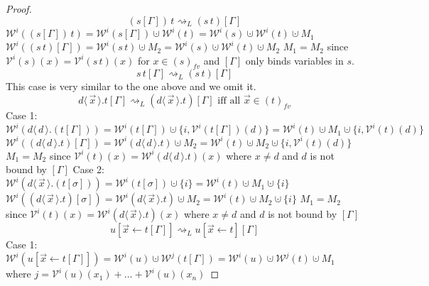 \documentclass[a4paper,UKenglish,cleveref, autoref]{lipics-v2019}
\newcommand{\fv}[1]{(#1)_{fv}}
\newcommand{\set}[1]{ \{ #1 \} }
\newcommand{\app}[2]{#1 \, #2}
\newcommand{\fake}[3]{#1 \langle \, #2 \, \rangle . #3}
\newcommand{\share}[3]{#1 [#2 \leftarrow #3]}
\newcommand{\weight}[2]{\mathcal{W}^{#1}(#2)}
\newcommand{\weightvar}[2]{\mathcal{V}^{#1}(#2)}
\begin{document}
\begin{proof}
$$\app{(s[\Gamma])}{t} \rightsquigarrow_{L} (\app{s}{t})[\Gamma]$$
$\weight{i}{\app{(s[\Gamma])}{t}} = \weight{i}{s[\Gamma]} \cupdot \weight{i}{t} = \weight{i}{s} \cupdot \weight{i}{t} \cupdot M_{1}$
\newline
$\weight{i}{ (\app{s}{t})[\Gamma]} = \weight{i}{\app{s}{t}} \cupdot M_{2} = \weight{i}{s} \cupdot \weight{i}{t} \cupdot M_{2}$ 
\newline
$M_{1} = M_{2}$ since $\weightvar{i}{s}(x) = \weightvar{i}{\app{s}{t}}(x)$ for $x \in \fv{s}$ and $[\Gamma]$ only binds variables in $s$.
\newline
$$\app{s}{t[\Gamma]} \rightsquigarrow_{L} (\app{s}{t})[\Gamma]$$
This case is very similar to the one above and we omit it.
\newline
$$\fake{d}{\vec{x}}{t[\Gamma]} \rightsquigarrow_{L} (\fake{d}{\vec{x}}{t})[\Gamma] \text{ iff all $\vec{x} \in \fv{t}$}$$
Case 1:
\newline
$\weight{i}{\fake{d}{d}{(t[\Gamma])}} = \weight{i}{t[\Gamma]} \cupdot \set{i, \weightvar{i}{t[\Gamma]}(d)} = \weight{i}{t} \cupdot M_{1} \cupdot \set{i, \weightvar{i}{t}(d)}$
\newline
$\weight{i}{(\fake{d}{d}{t})[\Gamma]} = \weight{i}{\fake{d}{d}{t}} \cupdot M_{2} =  \weight{i}{t} \cupdot M_{2} \cupdot \set{i, \weightvar{i}{t}(d)}$
\newline
$M_{1} = M_{2}$ since $\weightvar{i}{t}(x) = \weight{i}{\fake{d}{d}{t}}(x)$ where $x \neq d$ and $d$ is not bound by $[\Gamma]$
\newline
Case 2:
\newline
$\weight{i}{\fake{d}{\vec{x}}{(t[\sigma])}} = \weight{i}{t[\sigma]} \cupdot \set{i} = \weight{i}{t} \cupdot M_{1} \cupdot \set{i}$
\newline
$\weight{i}{(\fake{d}{\vec{x}}{t})[\sigma]} = \weight{i}{\fake{d}{\vec{x}}{t}} \cupdot M_{2} =  \weight{i}{t} \cupdot M_{2} \cupdot \set{i}$
\newline
$M_{1} = M_{2}$ since $\weightvar{i}{t}(x) = \weight{i}{\fake{d}{\vec{x}}{t}}(x)$ where $x \neq d$ and $d$ is not bound by $[\Gamma]$
\newline
$$\share{u}{\vec{x}}{t[\Gamma]} \rightsquigarrow_{L} \share{u}{\vec{x}}{t}[\Gamma]$$
Case 1:
\newline
$\weight{i}{\share{u}{\vec{x}}{t[\Gamma]}} = \weight{i}{u} \cupdot \weight{j}{t[\Gamma]} = \weight{i}{u} \cupdot \weight{j}{t} \cupdot M_{1}$
\newline
where $j = \weightvar{i}{u}(x_{1}) + \dots +  \weightvar{i}{u}(x_{n})$
\newline

\end{proof}
\end{document}
